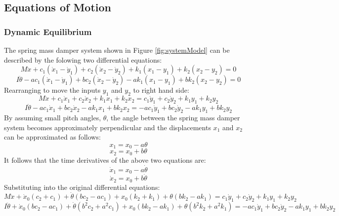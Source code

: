 \documentclass[12pt]{article}
\begin{document}
\subsection{Equations of Motion}
\subsubsection{Dynamic Equilibrium}
The spring mass damper system shown in Figure \ref{fig:systemModel} can be described by the folowing two differential equations: 
\begin{equation}
	M \ddot x + c_1(\dot x_1 - \dot y_1) + c_2(\dot x_2 - \dot y_2) + k_1(x_1 - y_1) + k_2(x_2 - y_2) = 0
\end{equation}
\begin{equation}
	I \ddot\theta - ac_1(\dot x_1 - \dot y_1) + bc_2(\dot x_2 - \dot y_2) - ak_1(x_1 - y_1) + bk_2(x_2 - y_2) = 0
\end{equation}
Rearranging to move the inputs $y_1$ and $y_2$ to right hand side: 
\begin{equation}
	M \ddot x + c_1\dot x_1 + c_2\dot x_2 + k_1x_1 + k_2x_2 = c_1\dot y_1 + c_2\dot y_2 + k_1y_1 + k_2y_2
\end{equation}
\begin{equation}
	I \ddot\theta - ac_1\dot x_1 + bc_2\dot x_2 - ak_1x_1 + bk_2x_2 = -ac_1\dot y_1 + bc_2\dot y_2 - ak_1y_1 + bk_2y_2
\end{equation}
By assuming small pitch angles, $\theta$, the angle between the spring mass damper system becomes approximately perpendicular and the displacements $x_1$ and $x_2$ can be approximated as follows:
\begin{equation}
	x_1 = x_0 - a\theta
\end{equation}
\begin{equation}
	x_2 = x_0 + b\theta
\end{equation}
It follows that the time derivatives of the above two equations are: 
\begin{equation}
	\dot x_1 = x_0 - a\dot\theta
\end{equation}
\begin{equation}
	\dot x_2 = x_0 + b\dot\theta
\end{equation}
Substituting into the original differential equations: 
\begin{equation}
	M \ddot x + \dot x_0(c_2+c_1) + \dot\theta(bc_2-ac_1) + x_0(k_2+k_1) + \theta(bk_2-ak_1)= c_1\dot y_1 + c_2\dot y_2 + k_1y_1 + k_2y_2
\end{equation}
\begin{equation}
	I \ddot\theta + \dot x_0(bc_2-ac_1) + \dot\theta(b^2c_2+a^2c_1) + x_0(bk_2-ak_1) + \theta(b^2k_2+a^2k_1) = -ac_1\dot y_1 + bc_2\dot y_2 - ak_1y_1 + bk_2y_2
\end{equation}
\end{document}
